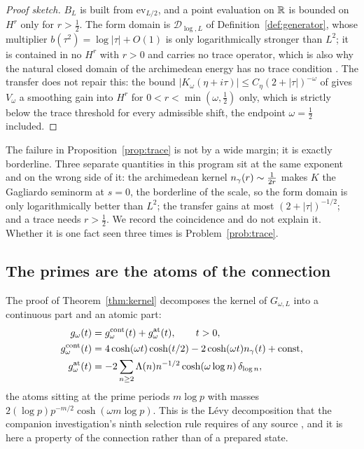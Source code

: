 \begin{proof}[Proof sketch]
$B_L$ is built from $\mathrm{ev}_{L/2}$, and a point evaluation on $\mathbb R$ is
bounded on $H^r$ only for $r>\frac12$. The form domain is
$\mathcal D_{\log,L}$ of Definition~\ref{def:generator}, whose multiplier
$b(\tau^2)=\log|\tau|+O(1)$ is only logarithmically stronger than $L^2$; it is
contained in no $H^r$ with $r>0$ and carries no trace operator, which is also why
the natural closed domain of the archimedean energy has no trace condition
\cite{InverseBulk}. The transfer does not repair this: the bound
$|K_\omega(\eta+i\tau)|\leq C_\eta(2+|\tau|)^{-\omega}$ of \cite{Background}
gives $V_\omega$ a smoothing gain into $H^r$ for $0<r<\min(\omega,\frac12)$ only,
which is strictly below the trace threshold for every admissible shift, the
endpoint $\omega=\frac12$ included.
\end{proof}

\begin{remark}\label{rem:marginal}
The failure in Proposition~\ref{prop:trace} is not by a wide margin; it is
exactly borderline. Three separate quantities in this program sit at the same
exponent and on the wrong side of it: the archimedean kernel
$n_{\gamma}(r)\sim\frac1{2r}$ makes $K$ the Gagliardo seminorm at $s=0$, the
borderline of the scale, so the form domain is only logarithmically better than
$L^2$; the transfer gains at most $(2+|\tau|)^{-1/2}$; and a trace needs
$r>\frac12$. We record the coincidence and do not explain it. Whether it is one
fact seen three times is Problem~\ref{prob:trace}.
\end{remark}

\subsection{The primes are the atoms of the connection}

The proof of Theorem~\ref{thm:kernel} decomposes the kernel of $G_{\omega,L}$
into a continuous part and an atomic part:
\begin{equation}\label{eq:atomic}
\begin{aligned}
 g_\omega(t)&=g_\omega^{\rm cont}(t)+g_\omega^{\rm at}(t),\qquad t>0,\\
 g_\omega^{\rm cont}(t)&=4\cosh(\omega t)\cosh(t/2)
   -2\cosh(\omega t)n_{\gamma}(t)+\mathrm{const},\\
 g_\omega^{\rm at}(t)&=-2\sum_{n\geq2}\Lambda(n)n^{-1/2}
   \cosh(\omega\log n)\,\delta_{\log n},
\end{aligned}
\end{equation}
the atoms sitting at the prime periods $m\log p$ with masses
$2(\log p)p^{-m/2}\cosh(\omega m\log p)$. This is the L\'evy decomposition that
the companion investigation's ninth selection rule requires of any source
\cite{Selection}, and it is here a property of the connection rather than of a
prepared state.


